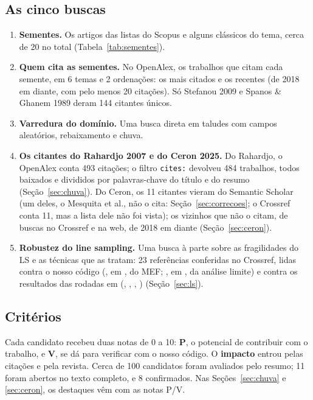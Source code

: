 \documentclass[11pt,a4paper]{article}
\begin{document}
\subsection{As cinco buscas}
\begin{enumerate}
  \item \textbf{Sementes.} Os artigos das listas do Scopus e alguns clássicos do tema, cerca de 20 no total
    (Tabela~\ref{tab:sementes}).
  \item \textbf{Quem cita as sementes.} No OpenAlex, os trabalhos que citam cada semente, em 6 temas e 2 ordenações:
    os mais citados e os recentes (de 2018 em diante, com pelo menos 20 citações). Só Stefanou 2009 e Spanos \&
    Ghanem 1989 deram 144 citantes únicos.
  \item \textbf{Varredura do domínio.} Uma busca direta em taludes com campos aleatórios, rebaixamento e chuva.
  \item \textbf{Os citantes do Rahardjo 2007 e do Ceron 2025.} Do Rahardjo, o OpenAlex conta 493 citações; o filtro
    \texttt{cites:} devolveu 484 trabalhos, todos baixados e divididos por palavras-chave do título e do resumo
    (Seção~\ref{sec:chuva}). Do Ceron, os 11 citantes vieram do Semantic Scholar (um deles, o Mesquita et al., não o
    cita: Seção~\ref{sec:correcoes}; o Crossref conta 11, mas a lista dele não foi vista); os
    vizinhos que não o citam, de buscas no Crossref e na web, de 2018 em diante (Seção~\ref{sec:ceron}).
  \item \textbf{Robustez do line sampling.} Uma busca à parte sobre as fragilidades do LS e as técnicas que as
    tratam: 23 referências conferidas no Crossref, lidas contra o nosso código (, em
    , do MEF; , em , da análise limite) e
    contra os resultados das rodadas em  (, ,
    , ) (Seção~\ref{sec:ls}).
\end{enumerate}

\subsection{Critérios}
Cada candidato recebeu duas notas de 0 a 10: \textbf{P}, o potencial de contribuir com o trabalho, e \textbf{V}, se dá
para verificar com o nosso código. O \textbf{impacto} entrou pelas citações e pela revista. Cerca de 100 candidatos
foram avaliados pelo resumo; 11 foram abertos no texto completo, e 8 confirmados. Nas Seções~\ref{sec:chuva} e
\ref{sec:ceron}, os destaques vêm com as notas P/V.
\end{document}
